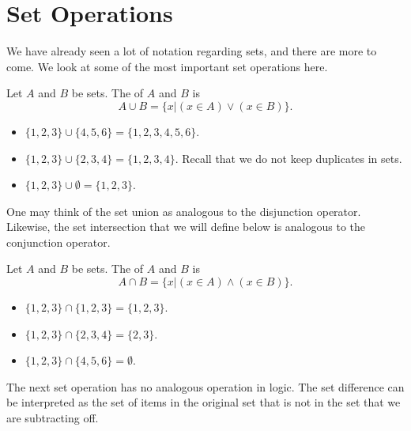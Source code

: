 \section{Set Operations}
We have already seen a lot of notation regarding sets, and there are more to come. We look at some of the most important set operations here.

\begin{definition}
    Let $A$ and $B$ be sets. The  of $A$ and $B$ is
    \[
        A \cup B = \{x \vert (x \in A) \lor (x \in B)\}.
    \]
\end{definition}

\begin{example}
    \begin{itemize}[leftmargin=*]
        \item $\{1, 2, 3\} \cup \{4, 5, 6\} = \{1, 2, 3, 4, 5, 6\}$.
        \item $\{1, 2, 3\} \cup \{2, 3, 4\} = \{1, 2, 3, 4\}$. Recall that we do not keep duplicates in sets.
        \item $\{1, 2, 3\} \cup \emptyset = \{1, 2, 3\}$.
    \end{itemize}
\end{example}

One may think of the set union as analogous to the disjunction operator. Likewise, the set intersection that we will define below is analogous to the conjunction operator.

\begin{definition}
    Let $A$ and $B$ be sets. The  of $A$ and $B$ is
    \[
        A \cap B = \{x \vert (x \in A) \land (x \in B)\}.
    \]
\end{definition}

\begin{example}
    \begin{itemize}[leftmargin=*]
        \item $\{1, 2, 3\} \cap \{1, 2, 3\} = \{1, 2, 3\}$.
        \item $\{1, 2, 3\} \cap \{2, 3, 4\} = \{2, 3\}$.
        \item $\{1, 2, 3\} \cap \{4, 5, 6\} = \emptyset$.
    \end{itemize}
\end{example}

The next set operation has no analogous operation in logic. The set difference can be interpreted as the set of items in the original set that is not in the set that we are subtracting off.

